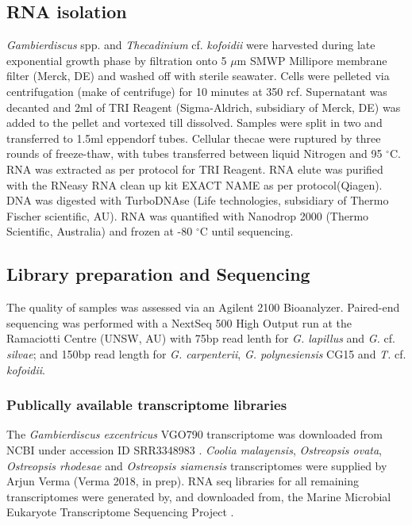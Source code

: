 \documentclass[12pt]{article}
\begin{document}
\subsection*{RNA isolation}
\emph{Gambierdiscus} spp. and \emph{Thecadinium} cf. \emph{kofoidii} were harvested during late exponential growth phase by filtration onto 5 $\mu$m SMWP Millipore membrane filter (Merck, DE) and washed off with sterile seawater. 
Cells were pelleted via centrifugation (make of centrifuge) for 10 minutes at 350 rcf. 
Supernatant was decanted and 2ml of TRI Reagent (Sigma-Aldrich, subsidiary of Merck, DE) was added to the pellet and vortexed till dissolved. 
Samples were split in two and transferred to 1.5ml eppendorf tubes. 
Cellular thecae were ruptured by three rounds of freeze-thaw, with tubes transferred between liquid Nitrogen and 95 $^{\circ}$C. 
RNA was extracted as per protocol for TRI Reagent. 
RNA elute was purified with the RNeasy RNA clean up kit EXACT NAME as per protocol(Qiagen). 
DNA was digested with TurboDNAse (Life technologies, subsidiary of Thermo Fischer scientific, AU). 
RNA was quantified with Nanodrop 2000 (Thermo Scientific, Australia) and frozen at -80 $^{\circ}$C until sequencing.
 
\subsection*{Library preparation and Sequencing}
The quality of samples was assessed via an Agilent 2100 Bioanalyzer. 
Paired-end sequencing was performed with a NextSeq 500 High Output run at the Ramaciotti Centre (UNSW, AU) with 75bp read lenth for \emph{G. lapillus} and \emph{G.} cf. \emph{silvae}; and 150bp read length for \emph{G. carpenterii}, \emph{G. polynesiensis} CG15 and \emph{T.} cf. \emph{kofoidii}.

\subsubsection*{Publically available transcriptome libraries}
The \emph{Gambierdiscus excentricus} VGO790 transcriptome was downloaded from NCBI under accession ID SRR3348983 \cite{kohli2017role}. 
\textit{Coolia malayensis}, \textit{Ostreopsis ovata}, \textit{Ostreopsis rhodesae} and \textit{Ostreopsis siamensis} transcriptomes were supplied by Arjun Verma (Verma 2018, in prep). 
RNA seq libraries for all remaining transcriptomes were generated by, and downloaded from, the Marine Microbial Eukaryote Transcriptome Sequencing Project \citep{keeling2014marine}.
\end{document}
